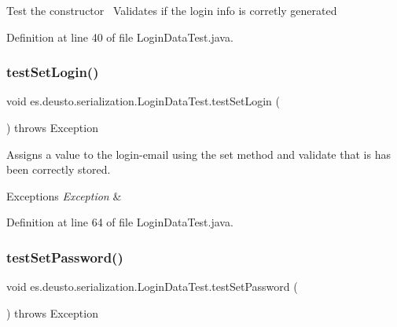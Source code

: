 Test the constructor~\newline
 Validates if the login info is corretly generated~\newline
 

Definition at line 40 of file Login\+Data\+Test.\+java.

\mbox{\label{classes_1_1deusto_1_1serialization_1_1_login_data_test_ae7fdbf8f891137e9442c2560d38d109d}} 
\subsubsection{\texorpdfstring{test\+Set\+Login()}{testSetLogin()}}
{\footnotesize\ttfamily void es.\+deusto.\+serialization.\+Login\+Data\+Test.\+test\+Set\+Login (\begin{DoxyParamCaption}{ }\end{DoxyParamCaption}) throws Exception}

Assigns a value to the login-\/email using the set method and validate that is has been correctly stored.~\newline

\begin{DoxyExceptions}{Exceptions}
{\em Exception} & \\
\hline
\end{DoxyExceptions}


Definition at line 64 of file Login\+Data\+Test.\+java.

\mbox{\label{classes_1_1deusto_1_1serialization_1_1_login_data_test_aac8283467e1233be9119041e34aaf969}} 
\subsubsection{\texorpdfstring{test\+Set\+Password()}{testSetPassword()}}
{\footnotesize\ttfamily void es.\+deusto.\+serialization.\+Login\+Data\+Test.\+test\+Set\+Password (\begin{DoxyParamCaption}{ }\end{DoxyParamCaption}) throws Exception}

